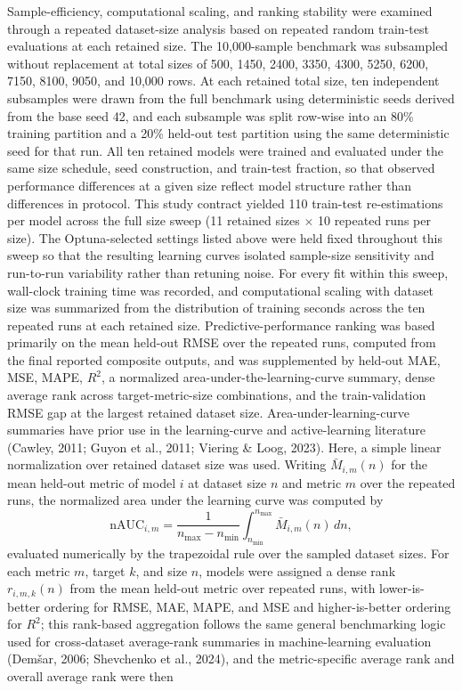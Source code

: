 \documentclass[a4paper,fleqn]{cas-sc}
\newenvironment{revblock}{\begingroup\color{revDefault}}{\endgroup}
\newenvironment{revblockr25}{\begingroup\color{revRtwoFive}}{\endgroup}
\begin{document}
\begin{revblock}
\begin{revblockr25}
Sample-efficiency, computational scaling, and ranking stability were examined through a repeated dataset-size analysis based on repeated random train-test evaluations at each retained size. The 10,000-sample benchmark was subsampled without replacement at total sizes of 500, 1450, 2400, 3350, 4300, 5250, 6200, 7150, 8100, 9050, and 10,000 rows. At each retained total size, ten independent subsamples were drawn from the full benchmark using deterministic seeds derived from the base seed 42, and each subsample was split row-wise into an 80\% training partition and a 20\% held-out test partition using the same deterministic seed for that run. All ten retained models were trained and evaluated under the same size schedule, seed construction, and train-test fraction, so that observed performance differences at a given size reflect model structure rather than differences in protocol. This study contract yielded 110 train-test re-estimations per model across the full size sweep (11 retained sizes $\times$ 10 repeated runs per size). The Optuna-selected settings listed above were held fixed throughout this sweep so that the resulting learning curves isolated sample-size sensitivity and run-to-run variability rather than retuning noise. For every fit within this sweep, wall-clock training time was recorded, and computational scaling with dataset size was summarized from the distribution of training seconds across the ten repeated runs at each retained size. Predictive-performance ranking was based primarily on the mean held-out RMSE over the repeated runs, computed from the final reported composite outputs, and was supplemented by held-out MAE, MSE, MAPE, $R^2$, a normalized area-under-the-learning-curve summary, dense average rank across target-metric-size combinations, and the train-validation RMSE gap at the largest retained dataset size. Area-under-learning-curve summaries have prior use in the learning-curve and active-learning literature (Cawley, 2011; Guyon et al., 2011; Viering \& Loog, 2023). Here, a simple linear normalization over retained dataset size was used. Writing $\bar{M}_{i,m}(n)$ for the mean held-out metric of model $i$ at dataset size $n$ and metric $m$ over the repeated runs, the normalized area under the learning curve was computed by
\begin{equation}
\mathrm{nAUC}_{i,m} = \frac{1}{n_{\max} - n_{\min}} \int_{n_{\min}}^{n_{\max}} \bar{M}_{i,m}(n)\,dn,
\end{equation}
evaluated numerically by the trapezoidal rule over the sampled dataset sizes. For each metric $m$, target $k$, and size $n$, models were assigned a dense rank $r_{i,m,k}(n)$ from the mean held-out metric over repeated runs, with lower-is-better ordering for RMSE, MAE, MAPE, and MSE and higher-is-better ordering for $R^2$; this rank-based aggregation follows the same general benchmarking logic used for cross-dataset average-rank summaries in machine-learning evaluation (Dem\v{s}ar, 2006; Shevchenko et al., 2024), and the metric-specific average rank and overall average rank were then

\end{revblockr25}
\end{revblock}
\end{document}
